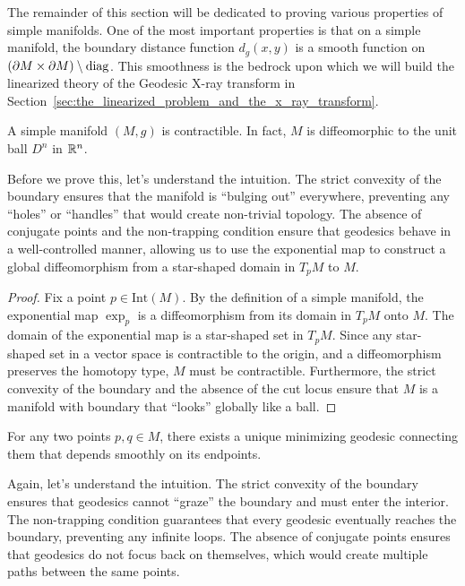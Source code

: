 The remainder of this section will be dedicated to proving various properties of simple manifolds. One of the most important properties is that on a simple manifold, the boundary distance function $d_g(x, y)$ is a smooth function on $(\partial M \times \partial M) \setminus \operatorname{diag}$. This smoothness is the bedrock upon which we will build the linearized theory of the Geodesic X-ray transform in Section~\ref{sec:the_linearized_problem_and_the_x_ray_transform}.

\begin{property}
  A simple manifold $(M, g)$ is contractible. In fact, $M$ is diffeomorphic to the unit ball $D^n$ in $\mathbb{R}^n$.
\end{property}

Before we prove this, let's understand the intuition. The strict convexity of the boundary ensures that the manifold is ``bulging out'' everywhere, preventing any ``holes'' or ``handles'' that would create non-trivial topology. The absence of conjugate points and the non-trapping condition ensure that geodesics behave in a well-controlled manner, allowing us to use the exponential map to construct a global diffeomorphism from a star-shaped domain in $T_pM$ to $M$.

\begin{proof}
  Fix a point $p \in \text{Int}(M)$. By the definition of a simple manifold, the exponential map $\exp_p$ is a diffeomorphism from its domain in $T_pM$ onto $M$. The domain of the exponential map is a star-shaped set in $T_pM$. Since any star-shaped set in a vector space is contractible to the origin, and a diffeomorphism preserves the homotopy type, $M$ must be contractible. Furthermore, the strict convexity of the boundary and the absence of the cut locus ensure that $M$ is a manifold with boundary that ``looks'' globally like a ball.
\end{proof}

\begin{property}
  For any two points $p, q \in M$, there exists a unique minimizing geodesic connecting them that depends smoothly on its endpoints.
\end{property}

Again, let's understand the intuition. The strict convexity of the boundary ensures that geodesics cannot ``graze'' the boundary and must enter the interior. The non-trapping condition guarantees that every geodesic eventually reaches the boundary, preventing any infinite loops. The absence of conjugate points ensures that geodesics do not focus back on themselves, which would create multiple paths between the same points.

